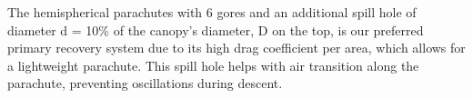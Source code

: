 The hemispherical parachutes with 6 gores and an additional spill hole of diameter d = 10\% of the canopy’s diameter, D on the top, is our preferred primary recovery system due to its high drag coefficient per area, which allows for a lightweight parachute. This spill hole helps with air transition along the parachute, preventing oscillations during descent.

